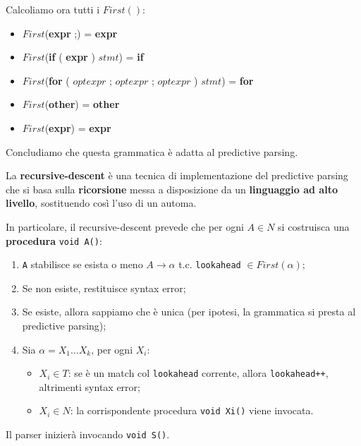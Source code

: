\documentclass[12pt]{article}
\begin{document}
Calcoliamo ora tutti i $First()$:
\begin{itemize}
    \item $First$(\textbf{expr} ;) = \textbf{expr}
    \item $First$(\textbf{if} ( \textbf{expr} ) $stmt$) = \textbf{if}
    \item $First$(\textbf{for} ( $optexpr$ ; $optexpr$ ; $optexpr$ ) $stmt$) = \textbf{for}
    \item $First$(\textbf{other}) = \textbf{other}
    \item $First$(\textbf{expr}) = \textbf{expr}
\end{itemize}
Concludiamo che questa grammatica è adatta al predictive parsing.

\bigskip
\begin{definition}
La \textbf{recursive-descent} è una tecnica di implementazione del predictive parsing che si basa sulla \textbf{ricorsione} messa a disposizione da un \textbf{linguaggio ad alto livello}, sostituendo così l'uso di un automa.
\end{definition}
\noindent \begin{minipage}{\textwidth}
In particolare, il recursive-descent prevede che per ogni $A \in N$ si costruisca una \textbf{procedura} \texttt{void A()}:
\begin{enumerate}
    \item \texttt{A} stabilisce se esista o meno $A \rightarrow \alpha$ t.c. \texttt{lookahead} $\in First(\alpha)$;
    \item Se non esiste, restituisce syntax error;
    \item Se esiste, allora sappiamo che è unica (per ipotesi, la grammatica si presta al predictive parsing);
    \item Sia $\alpha = X_1 \dots X_k$, per ogni $X_i$:
    \begin{itemize}
        \item $X_i \in T$: se è un match col \texttt{lookahead} corrente, allora \texttt{lookahead++}, altrimenti syntax error;
        \item $X_i \in N$: la corrispondente procedura \texttt{void Xi()} viene invocata.
    \end{itemize}
\end{enumerate}
Il parser inizierà invocando \texttt{void S()}.
\end{minipage}\\
\end{document}
